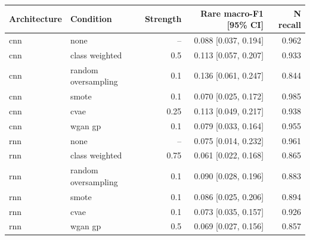 \begin{tabular}{llrrr}
\toprule
Architecture & Condition & Strength & Rare macro-F1 [95\% CI] & N recall \\
\midrule
cnn & none & -- & 0.088 [0.037, 0.194] & 0.962 \\
cnn & class weighted & 0.5 & 0.113 [0.057, 0.207] & 0.933 \\
cnn & random oversampling & 0.1 & 0.136 [0.061, 0.247] & 0.844 \\
cnn & smote & 0.1 & 0.070 [0.025, 0.172] & 0.985 \\
cnn & cvae & 0.25 & 0.113 [0.049, 0.217] & 0.938 \\
cnn & wgan gp & 0.1 & 0.079 [0.033, 0.164] & 0.955 \\
rnn & none & -- & 0.075 [0.014, 0.232] & 0.961 \\
rnn & class weighted & 0.75 & 0.061 [0.022, 0.168] & 0.865 \\
rnn & random oversampling & 0.1 & 0.090 [0.028, 0.196] & 0.883 \\
rnn & smote & 0.1 & 0.086 [0.025, 0.206] & 0.894 \\
rnn & cvae & 0.1 & 0.073 [0.035, 0.157] & 0.926 \\
rnn & wgan gp & 0.5 & 0.069 [0.027, 0.156] & 0.857 \\
\bottomrule
\end{tabular}
